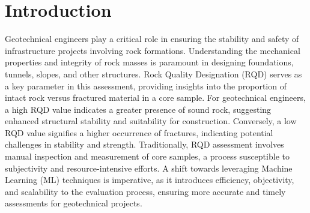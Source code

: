 \documentclass[sigconf,authordraft]{acmart}
\begin{document}



\maketitle

\section{Introduction}

Geotechnical engineers play a critical role in ensuring the stability and safety of infrastructure projects involving rock formations. Understanding the mechanical properties and integrity of rock masses is paramount in designing foundations, tunnels, slopes, and other structures. Rock Quality Designation (RQD) serves as a key parameter in this assessment, providing insights into the proportion of intact rock versus fractured material in a core sample. For geotechnical engineers, a high RQD value indicates a greater presence of sound rock, suggesting enhanced structural stability and suitability for construction. Conversely, a low RQD value signifies a higher occurrence of fractures, indicating potential challenges in stability and strength. Traditionally, RQD assessment involves manual inspection and measurement of core samples, a process susceptible to subjectivity and resource-intensive efforts. A shift towards leveraging Machine Learning (ML) techniques is imperative, as it introduces efficiency, objectivity, and scalability to the evaluation process, ensuring more accurate and timely assessments for geotechnical projects.
\end{document}
